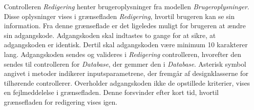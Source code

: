 \noindent
Controlleren \textit{Redigering} henter brugeroplysninger fra modellen \textit{Brugeroplysninger}. Disse oplysninger vises i grænsefladen \textit{Redigering}, hvortil brugeren kan se sin information. Fra denne grænseflade er det ligeledes muligt for brugeren at ændre sin adgangskode. Adgangskoden skal indtastes to gange for at sikre, at adgangskoden er identisk. Dertil skal adgangskoden være minimum 10 karakterer lang. Adgangskoden sendes og valideres i \textit{Redigering} controlleren, hvorefter den sendes til controlleren for \textit{Database}, der gemmer den i \textit{Database}. Asterisk symbol angivet i metoder indikerer inputsparametrene, der fremgår af designklasserne for tilhørende controllerer. Overholder adgangskoden ikke de opstillede kriterier, vises en fejlmeddelelse i grænsefladen. Denne forsvinder efter kort tid, hvortil grænsefladen for redigering vises igen. 

